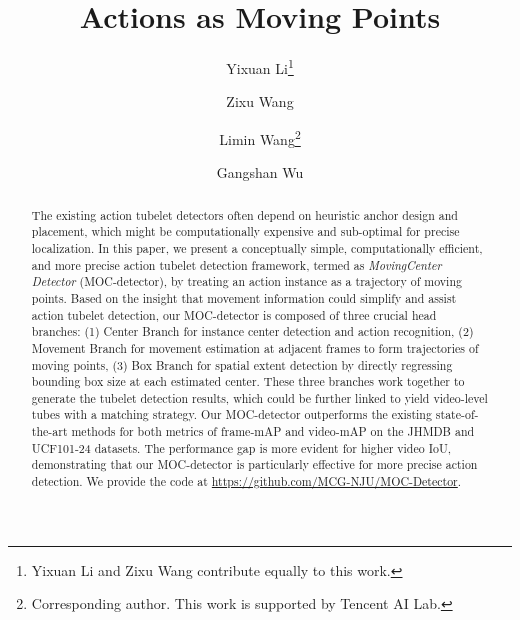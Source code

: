 \documentclass[runningheads]{llncs}
\begin{document}
\renewcommand{\thefootnote}{\fnsymbol{footnote}}
\pagestyle{headings}
\mainmatter

\title{Actions as Moving Points}





\author{Yixuan Li\thanks{Yixuan Li and Zixu Wang contribute equally to this work.} \and
Zixu Wang \and
Limin Wang\thanks{Corresponding author. This work is supported by Tencent AI Lab.} \and
Gangshan Wu
}

\maketitle
\begin{abstract}
  The existing action tubelet detectors often depend on heuristic anchor design and placement, which might be computationally expensive and sub-optimal for precise localization. In this paper, we present a conceptually simple, computationally efficient, and more precise action tubelet detection framework, termed as {\em MovingCenter Detector} (MOC-detector), by treating an action instance as a trajectory of moving points. Based on the insight that movement information could simplify and assist action tubelet detection, our MOC-detector is composed of three crucial head branches: (1) Center Branch for instance center detection and action recognition, (2) Movement Branch for movement estimation at adjacent frames to form trajectories of moving points, (3) Box Branch for spatial extent detection by directly regressing bounding box size at each estimated center. These three branches work together to generate the tubelet detection results, which could be further linked to yield video-level tubes with a matching strategy. Our MOC-detector outperforms the existing state-of-the-art methods for both metrics of frame-mAP and video-mAP on the JHMDB and UCF101-24 datasets. The performance gap is more evident for higher video IoU, demonstrating that our MOC-detector is particularly effective for more precise action detection. We provide the code at \href{https://github.com/MCG-NJU/MOC-Detector}{https://github.com/MCG-NJU/MOC-Detector}.
\end{abstract}
\end{document}
